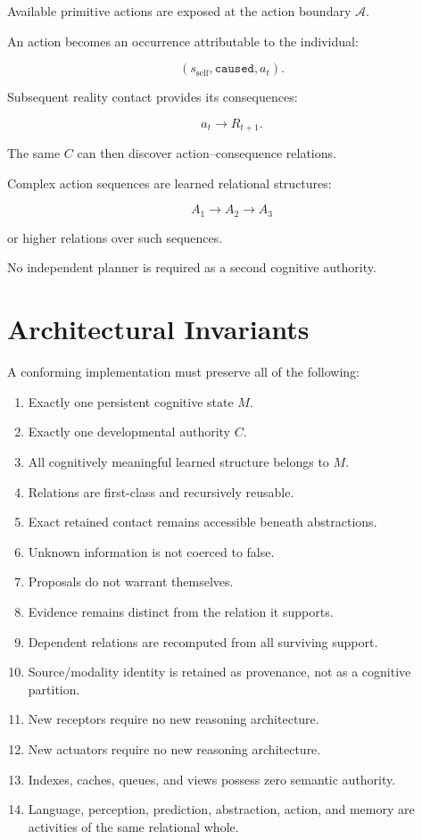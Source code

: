 \documentclass[11pt]{article}
\newcommand{\Ax}{\mathcal{A}}
\begin{document}
Available primitive actions are exposed at the action boundary $\Ax$.

An action becomes an occurrence attributable to the individual:

\[
(s_{\text{self}},\texttt{caused},a_t).
\]

Subsequent reality contact provides its consequences:

\[
a_t\rightarrow R_{t+1}.
\]

The same $C$ can then discover action--consequence relations.

Complex action sequences are learned relational structures:

\[
A_1\rightarrow A_2\rightarrow A_3
\]

or higher relations over such sequences.

No independent planner is required as a second cognitive authority.

\section{Architectural Invariants}

A conforming implementation must preserve all of the following:

\begin{enumerate}[leftmargin=2em]
    \item Exactly one persistent cognitive state $M$.
    \item Exactly one developmental authority $C$.
    \item All cognitively meaningful learned structure belongs to $M$.
    \item Relations are first-class and recursively reusable.
    \item Exact retained contact remains accessible beneath abstractions.
    \item Unknown information is not coerced to false.
    \item Proposals do not warrant themselves.
    \item Evidence remains distinct from the relation it supports.
    \item Dependent relations are recomputed from all surviving support.
    \item Source/modality identity is retained as provenance, not as a cognitive partition.
    \item New receptors require no new reasoning architecture.
    \item New actuators require no new reasoning architecture.
    \item Indexes, caches, queues, and views possess zero semantic authority.
    \item Language, perception, prediction, abstraction, action, and memory are activities of the same relational whole.
\end{enumerate}
\end{document}
